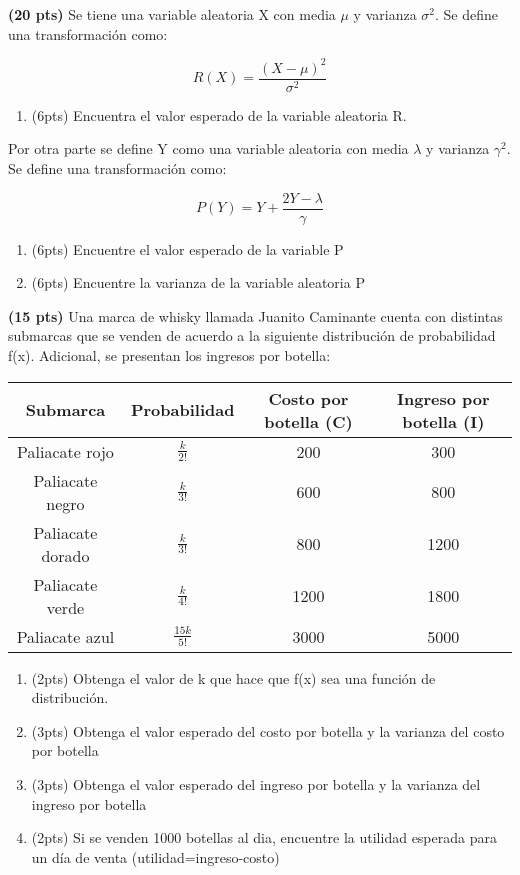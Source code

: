 \documentclass[addpoints]{exam}
\theoremstyle{mytheor}
\begin{document}
  \begin{questions}

\question \textbf{(20 pts)}
Se tiene una variable aleatoria X con media $\mu$ y varianza $\sigma^2$. Se define una transformación como: 

$$R(X) = \frac{(X-\mu)^2}{\sigma^2}$$

\begin{enumerate}[label=\Alph*)]
\item (6pts) Encuentra el valor esperado de la variable aleatoria R.
\end{enumerate}

Por otra parte se define Y como una variable aleatoria con media $\lambda$ y varianza $\gamma^2$. Se define una transformación como:

$$P(Y) = Y + \frac{2Y-\lambda}{\gamma}$$

\begin{enumerate}[label=\Alph*)]
\item (6pts) Encuentre el valor esperado de la variable P
\item (6pts) Encuentre la varianza de la variable aleatoria P
\end{enumerate}

\question \textbf{(15 pts)}
Una marca de whisky llamada Juanito Caminante cuenta con distintas submarcas que se venden de acuerdo a la siguiente distribución de probabilidad f(x). Adicional, se presentan los ingresos por botella:

\begin{center}
\begin{tabular}{ |c|c|c|c| } 
\hline
Submarca & Probabilidad & Costo por botella (C) & Ingreso por botella (I)\\
 \hline
 Paliacate rojo & $\frac{k}{2!}$ & 200 & 300 \\ 
 Paliacate negro & $\frac{k}{3!}$ & 600 & 800 \\ 
 Paliacate dorado & $\frac{k}{3!}$ & 800 & 1200 \\ 
 Paliacate verde & $\frac{k}{4!}$ & 1200 & 1800 \\
 Paliacate azul & $\frac{15k}{5!}$ & 3000 & 5000 \\ 
 \hline
\end{tabular}
\end{center}


\begin{enumerate}[label=\Alph*)]
\item (2pts) Obtenga el valor de k que hace que f(x) sea una función de distribución.
\item (3pts) Obtenga el valor esperado del costo por botella y la varianza del costo por botella 
\item (3pts) Obtenga el valor esperado del ingreso por botella y la varianza del ingreso por botella 
\item (2pts) Si se venden 1000 botellas al dia, encuentre la utilidad esperada para un día de venta (utilidad=ingreso-costo)
\end{enumerate}


\end{questions}
\end{document}
